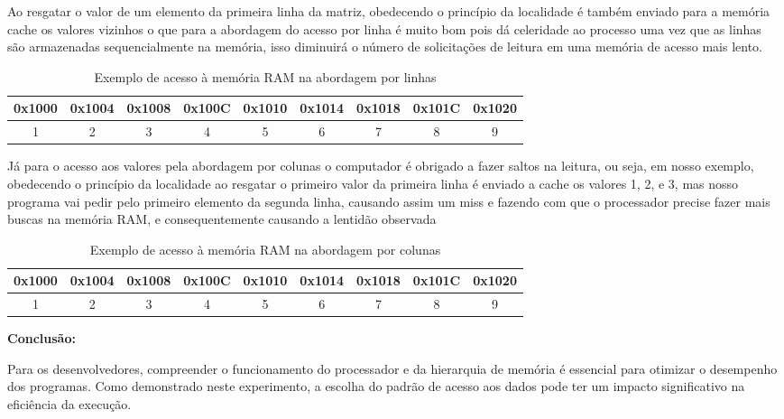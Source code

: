 \documentclass[a4paper, 12pt]{article}
\begin{document}
	Ao resgatar o valor de um elemento da primeira linha da matriz, obedecendo o princípio da localidade é também enviado para a memória cache os valores vizinhos o que para a abordagem do acesso por linha é muito bom pois dá celeridade ao processo uma vez que as linhas são armazenadas sequencialmente na memória, isso diminuirá o número de solicitações de leitura em uma memória de acesso mais lento.
	
	\begin{table}[ht]
	\centering
		\begin{tabular}{|c|c|c|c|c|c|c|c|c|}
			\hline
			0x1000 & 0x1004 & 0x1008 & 0x100C & 0x1010 & 0x1014 & 0x1018 & 0x101C & 0x1020 \\
			\hline
			\cellcolor{cyan}1      & \cellcolor{cyan}2      & \cellcolor{cyan}3      & 4      & 5      & 6      & 7      & 8      & 9      \\
			\hline
		\end{tabular}
		\caption{Exemplo de acesso à memória RAM na abordagem por linhas}
	\end{table}
	
	 Já para o acesso aos valores pela abordagem por colunas o computador é obrigado a fazer saltos na leitura, ou seja, em nosso exemplo, obedecendo o princípio da localidade ao resgatar o primeiro valor da primeira linha é enviado a cache os valores 1, 2, e 3, mas nosso programa vai pedir pelo primeiro elemento da segunda linha, causando assim um miss e fazendo com que o processador precise fazer mais buscas na memória RAM, e consequentemente causando a lentidão observada
	
	\begin{table}[ht]
	\centering
		\begin{tabular}{|c|c|c|c|c|c|c|c|c|}
			\hline
			0x1000 & 0x1004 & 0x1008 & 0x100C & 0x1010 & 0x1014 & 0x1018 & 0x101C & 0x1020 \\
			\hline
			\cellcolor{cyan}1      & 2      & 3      & \cellcolor{cyan}4      & 5      & 6      & \cellcolor{cyan}7      & 8      & 9      \\
			\hline
		\end{tabular}
	\caption{Exemplo de acesso à memória RAM na abordagem por colunas}
	\end{table}
	
	\vspace{0,5cm}
	
	\textbf{Conclusão:}
	
	Para os desenvolvedores, compreender o funcionamento do processador e da hierarquia de memória é essencial para otimizar o desempenho dos programas. Como demonstrado neste experimento, a escolha do padrão de acesso aos dados pode ter um impacto significativo na eficiência da execução.


	
	
\end{document}
